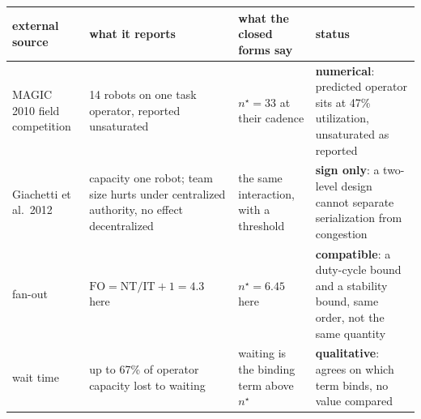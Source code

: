 \begin{tabular}{@{}p{}p{}p{}p{}@{}}
\toprule
external source & what it reports & what the closed forms say & status \\
\midrule
MAGIC 2010 field competition \citep{olson2012magic} & 14 robots on one task operator, reported unsaturated & $n^\star = 33$ at their cadence & \textbf{numerical}: predicted operator sits at 47\% utilization, unsaturated as reported \\
Giachetti et al.\ 2012 \citep{giachetti2012agent} & capacity one robot; team size hurts under centralized authority, no effect decentralized & the same interaction, with a threshold & \textbf{sign only}: a two-level design cannot separate serialization from congestion \\
fan-out \citep{olsen2004fanout,crandall2005validating} & $\mathrm{FO} = \mathrm{NT}/\mathrm{IT} + 1 = 4.3$ here & $n^\star = 6.45$ here & \textbf{compatible}: a duty-cycle bound and a stability bound, same order, not the same quantity \\
wait time \citep{cummings2008predicting} & up to 67\% of operator capacity lost to waiting & waiting is the binding term above $n^\star$ & \textbf{qualitative}: agrees on which term binds, no value compared \\
\bottomrule
\end{tabular}
